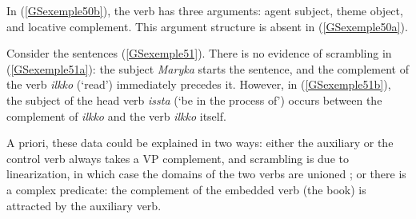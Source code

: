 \documentclass[output=paper
	        ,collection
	        ,collectionchapter
 	        ,biblatex
                ,babelshorthands
                ,newtxmath
                ,draftmode
                ,colorlinks, citecolor=brown
]{langscibook}
\begin{document}
{\eal
	\label{GSexemple50} 
    \label{GSexemple50a}

    \label{GSexemple50b}
\zl

In (\ref{GSexemple50b}), the verb has three arguments: agent subject, theme object, and locative complement. This argument structure is absent in (\ref{GSexemple50a}).

Consider the sentences (\ref{GSexemple51}). There is no evidence of scrambling in (\ref{GSexemple51a}): the subject \emph{Maryka} starts the sentence, and the complement of the verb \emph{ilkko} (`read') immediately precedes it. However, in (\ref{GSexemple51b}), the subject of the head verb \emph{issta} (`be in the process of') occurs between the complement of \emph{ilkko} and the verb \emph{ilkko} itself.
\eal
	\label{GSexemple51}
	\label{GSexemple51a}
		
	\label{GSexemple51b}

\zl

A priori, these data could be explained in two ways: either the auxiliary or the control verb always takes a VP complement, and scrambling is due to linearization, in which case the domains of the two verbs are unioned \citep{Reape94a}; or there is a complex predicate: the complement of the embedded verb (the book) is attracted by the auxiliary verb. 

}
\end{document}
